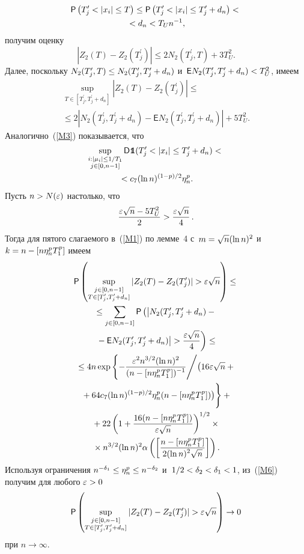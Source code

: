\begin{multicols}{2}
\noindent
\begin{multline*}
{\sf P}\left(T_j^\prime < |x_i| \leq T \right) \leq {\sf P}\left(T_j^\prime < |x_i| \leq 
T_j^\prime+d_n\right) <{}\\
{}< d_n < T_U n^{-1}, 
\end{multline*}
получим  оценку
$$
|Z_2(T)-Z_2(T_j^\prime)| \leq 2 N_2(T_j^\prime, T) +  3 T_U^2 .
$$
Далее, поскольку $N_2 (T_j^\prime, T) \hm\leq N_2 (T_j^\prime, T_j^\prime+d_n)$ и~${\mathsf E} N_2 (T_j^\prime, T_j^\prime+d_n) \hm< T_U^2$,
имеем
\begin{multline*}
\sup\limits_{T \in [T_j^\prime, T_j^\prime+d_n]} |Z_2(T)-Z_2(T_j^\prime)| \leq {}\\
{}\leq
2 \left|N_2 (T_j^\prime, T_j^\prime+d_n) - {\mathsf E} N_2 (T_j^\prime, 
T_j^\prime+d_n)\right| +  5 T_U^2 .
\end{multline*}
Аналогично~(\ref{M3}) показывается, что
\begin{multline}
\label{M11}
\sup\limits_{\substack{i : |\mu_i| \leq 1/T_1 \\ j \in [0, n-1]}} {\mathsf D} \mbox{{{\tt 1}}\hspace{-1.3mm}{\sf 1}} 
(T_j^\prime < |x_i| \leq T_j^\prime + d_n) <{}\\
{}< c_7 (\ln n)^{(1-p)/2} \eta_n^p.
\end{multline}
Пусть $n > N(\varepsilon)$ настолько, что 
$$
\displaystyle\frac{\displaystyle \varepsilon\sqrt{n} - 5 T_U^2\mathstrut}{\displaystyle 2\mathstrut} > \displaystyle\frac{\displaystyle \varepsilon \sqrt{n} \mathstrut}{\displaystyle 4\mathstrut}\,.
$$
%
 Тогда для пятого слагаемого в~(\ref{M1}) по лемме~4 с~$m \hm= 
\sqrt{n} (\ln n)^2$ и~$k \hm= n\hm-[n\eta_n^p T_1^p]$ имеем
\begin{multline}
\p \left(\sup\limits_{\substack{j \in [0, n-1] \\ T\in 
[T_j^{\prime},T_j^{\prime}+d_n]}} |Z_2(T)-Z_2(T_j^{\prime})| > 
\eps\sqrt{n}\right) \leq{}\\
{}\leq  \sum\limits_{j \in [0, n-1]} \p \left(  \left|N_2 (T_j^\prime, 
T_j^\prime+d_n) -{}\right.\right.\\
\left.\left.{}- {\mathsf E} N_2 (T_j^\prime, T_j^\prime+d_n)\right| > \fr{\eps\sqrt{n}}{4} 
\right) \leq{}\\
{}\leq  4n \exp \left\{ -  \fr{\eps^2 n^{3/2} (\ln n)^2}{(n-[n\eta_n^p T_1^p])^{-1}}\Bigg/ 
\big( 16 \eps \sqrt{n} +{}\right.\\
\left.{}+ 64 c_7 (\ln n)^{(1-p)/2} \eta_n^p (n-[n\eta_n^p 
T_1^p]) \big) 
\vphantom{\fr{\eps^2 n^{3/2} (\ln n)^2}{(n-[n\eta_n^p T_1^p])^{-1}}}
\right\} +{}\\
{}+ 22 \left(1+\fr{16 (n-[n\eta_n^p T_1^p])}{\eps \sqrt{n}}\right)^{1/2}\times{}\\
{}\times 
n^{3/2} (\ln n)^2 \alpha\left(\left[\fr{n-[n\eta_n^p T_1^p]}{2 (\ln n)^2 
\sqrt{n}}\right]\right).
\label{M6}
\end{multline}
Используя ограничения $n^{-\delta_1}\hm\leq \eta_n^p\hm \leq n^{-\delta_2}$ 
и~$1/2\hm<\delta_2\hm<\delta_1<1$, из~(\ref{M6}) получим для любого $\eps\hm>0$
$$
{\sf P} \left(\sup\limits_{\substack{j \in [0, n-1] \\ T\in 
[T_j^{\prime},T_j^{\prime}+d_n]}} |Z_2(T)-Z_2(T_j^{\prime})| > 
\varepsilon\sqrt{n}\right) \to 0
$$
при $n \to \infty$.


\end{multicols}
